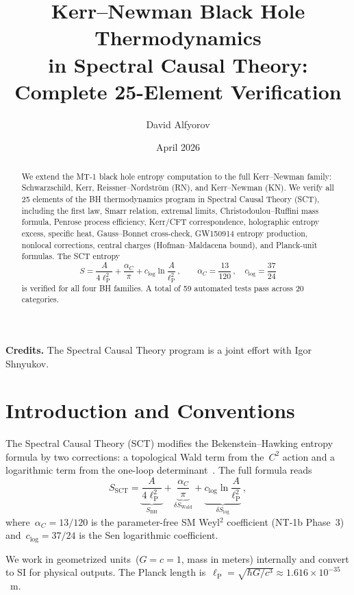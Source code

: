 \documentclass[11pt,a4paper]{article}
\title{Kerr--Newman Black Hole Thermodynamics\\
       in Spectral Causal Theory:\\
       Complete 25-Element Verification}
\author{David Alfyorov}
\date{April 2026}
\newcommand{\lP}{\ell_{\mathrm{P}}}
\newcommand{\alpC}{\alpha_C}
\newcommand{\clog}{c_{\log}}
\begin{document}
\maketitle

\noindent
\textbf{Credits.}
The Spectral Causal Theory program is a joint effort with Igor Shnyukov.

\begin{abstract}
We extend the MT-1 black hole entropy computation to the full
Kerr--Newman family: Schwarzschild, Kerr, Reissner--Nordstr\"om (RN),
and Kerr--Newman (KN).  We verify all 25 elements of the BH
thermodynamics program in Spectral Causal Theory (SCT), including
the first law, Smarr relation, extremal limits, Christodoulou--Ruffini
mass formula, Penrose process efficiency, Kerr/CFT correspondence,
holographic entropy excess, specific heat, Gauss--Bonnet cross-check,
GW150914 entropy production, nonlocal corrections, central charges
(Hofman--Maldacena bound), and Planck-unit formulas.  The SCT entropy
\[
  S = \frac{A}{4\lP^2} + \frac{\alpC}{\pi} + \clog\ln\!\frac{A}{\lP^2}\,,
  \qquad \alpC = \frac{13}{120}\,,\quad \clog = \frac{37}{24}
\]
is verified for all four BH families.  A total of 59 automated tests
pass across 20 categories.
\end{abstract}

\tableofcontents

\section{Introduction and Conventions}\label{sec:intro}

The Spectral Causal Theory (SCT) modifies the Bekenstein--Hawking
entropy formula by two corrections: a topological Wald term from
the~$C^2$ action and a logarithmic term from the one-loop
determinant~\cite{Sen2012}.  The full formula reads
\begin{equation}\label{eq:S-SCT}
  S_{\mathrm{SCT}} = \underbrace{\frac{A}{4\lP^2}}_{S_{\mathrm{BH}}}
    + \underbrace{\frac{\alpC}{\pi}}_{\delta S_{\mathrm{Wald}}}
    + \underbrace{\clog\ln\frac{A}{\lP^2}}_{\delta S_{\log}}\,,
\end{equation}
where~$\alpC = 13/120$ is the parameter-free SM Weyl$^2$ coefficient
(NT-1b Phase~3) and~$\clog = 37/24$ is the Sen logarithmic
coefficient.

We work in geometrized units~($G = c = 1$, mass in meters) internally
and convert to SI for physical outputs.  The Planck length
is~$\lP = \sqrt{\hbar G/c^3} \approx 1.616\times 10^{-35}$~m.
\end{document}
